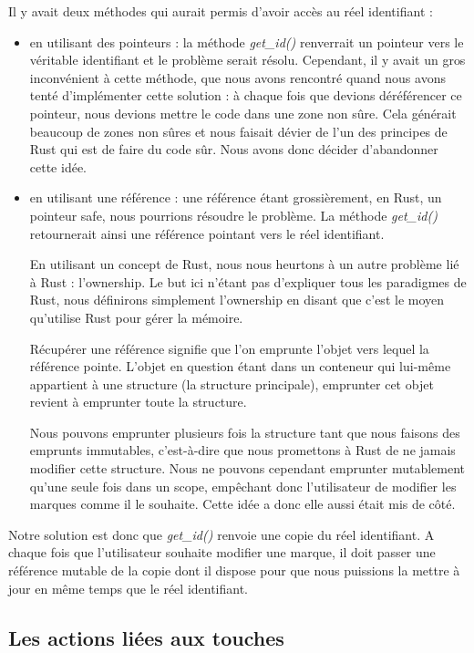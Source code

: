 \documentclass[12pt]{article}
\begin{document}
Il y avait deux méthodes qui aurait permis d'avoir accès au réel identifiant :
\begin{itemize}
\item en utilisant des pointeurs : la méthode \textit{get\_id()} renverrait un pointeur 
vers le véritable identifiant et le problème serait résolu. Cependant, il y avait un gros
inconvénient à cette méthode, que nous avons rencontré quand nous avons tenté
d'implémenter cette solution : à chaque fois que devions déréférencer ce pointeur, nous
devions mettre le code dans une zone non sûre. Cela générait beaucoup de zones non sûres 
et nous faisait dévier de l'un des principes de Rust qui est de faire du code sûr. Nous 
avons donc décider d'abandonner 
cette idée.
\item en utilisant une référence : une référence étant grossièrement, en Rust, un 
pointeur safe, nous pourrions résoudre le problème. La méthode \textit{get\_id()} 
retournerait ainsi une référence pointant vers le réel identifiant. 

En utilisant un concept de Rust, nous nous heurtons à un autre problème lié à Rust : 
l'ownership. Le but ici n'étant pas d'expliquer tous les paradigmes de Rust, nous 
définirons simplement l'ownership en disant que c'est le moyen qu'utilise Rust pour gérer la mémoire.

Récupérer une référence signifie que l'on emprunte l'objet vers lequel la référence
pointe. L'objet en question étant dans un conteneur qui lui-même appartient à une 
structure (la structure principale), emprunter cet objet revient à emprunter toute la 
structure. 

Nous pouvons emprunter plusieurs fois la structure tant que nous faisons des 
emprunts immutables, c'est-à-dire que nous promettons à Rust de ne jamais modifier cette
structure. Nous ne pouvons cependant emprunter mutablement qu'une seule fois dans un scope, empêchant donc l'utilisateur de modifier les marques comme il le souhaite.
Cette idée a donc elle aussi était mis de côté.
\end{itemize}

Notre solution est donc que \textit{get\_id()} renvoie une copie du réel identifiant. A chaque 
fois que l'utilisateur souhaite modifier une marque, il doit passer une référence mutable
de la copie dont il dispose pour que nous puissions la mettre à jour en même temps que
le réel identifiant.

\subsection{Les actions liées aux touches}
\end{document}

